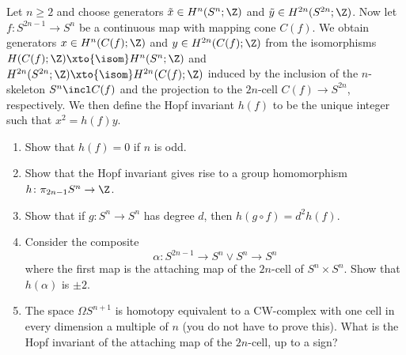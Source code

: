 \begin{exercise}\label{ex:hopfinvariant}
	Let $n \geq 2$ and choose generators $\tilde{x} \in H^n(S^n; \Z)$ and $\tilde{y} \in H^{2n}(S^{2n}; \Z)$.
	Now let $f\colon S^{2n - 1} \to S^n$ be a continuous map with mapping cone $C(f)$.
	We obtain generators $x \in H^n(C(f); \Z)$ and $y \in H^{2n}(C(f); \Z)$ from the isomorphisms $H(C(f); \Z) \xto{\isom} H^n(S^n; \Z)$ and $H^{2n}(S^{2n}; \Z) \xto{\isom} H^{2n}(C(f); \Z)$ induced by the inclusion of the $n$-skeleton $S^n \incl C(f)$ and the projection to the $2n$-cell $C(f) \to S^{2n}$, respectively.
	We then define the Hopf invariant $h(f)$ to be the unique integer such that $x^2 = h(f) y$.
	\begin{enumerate}
		\item Show that $h(f) = 0$ if $n$ is odd.
		\item Show that the Hopf invariant gives rise to a group homomorphism $h\colon \pi_{2n - 1} S^n \to \Z$.
		\item Show that if $g\colon S^n \to S^n$ has degree $d$, then $h(g \circ f) = d^2 h(f)$.
		\item Consider the composite
			\begin{equation*}
				\alpha\colon S^{2n - 1} \to S^n \vee S^n \to S^n
			\end{equation*}
			where the first map is the attaching map of the $2n$-cell of $S^n \times S^n$.
			Show that $h(\alpha)$ is $\pm 2$.
		\item The space $\Omega S^{n + 1}$ is homotopy equivalent to a CW-complex with one cell in every dimension a multiple of $n$ (you do not have to prove this).
			What is the Hopf invariant of the attaching map of the $2n$-cell, up to a sign?
	\end{enumerate}
\end{exercise}
